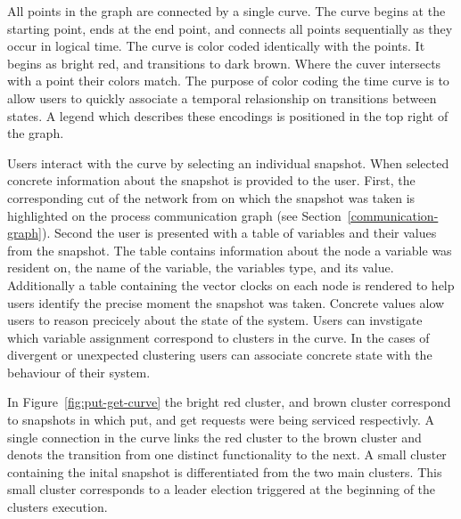         All points in the graph are connected by a single curve. The
        curve begins at the starting point, ends at the end point, and
        connects all points sequentially as they occur in logical
        time. The curve is color coded identically with the points. It
        begins as bright red, and transitions to dark brown. Where the
        cuver intersects with a point their colors match. The purpose
        of color coding the time curve is to allow users to quickly
        associate a temporal relasionship on transitions between
        states. A legend which describes these encodings is positioned
        in the top right of the graph.

        Users interact with the curve by selecting an individual
        snapshot. When selected concrete information about the
        snapshot is provided to the user. First, the corresponding cut
        of the network from on which the snapshot was taken is
        highlighted on the process communication graph (see
        Section~\ref{communication-graph}). Second the user is
        presented with a table of variables and their values from the
        snapshot. The table contains information about the node a
        variable was resident on, the name of the variable, the
        variables type, and its value. Additionally a table containing
        the vector clocks on each node is rendered to help users
        identify the precise moment the snapshot was taken. Concrete
        values alow users to reason precicely about the state of the
        system. Users can invstigate which variable assignment
        correspond to clusters in the curve. In the cases of divergent
        or unexpected clustering users can associate concrete state
        with the behaviour of their system.

        In Figure~\ref{fig:put-get-curve} the bright red cluster, and
        brown cluster correspond to snapshots in which put, and get
        requests were being serviced respectivly. A single connection
        in the curve links the red cluster to the brown cluster and
        denots the transition from one distinct functionality to the
        next. A small cluster containing the inital snapshot is
        differentiated from the two main clusters. This small cluster
        corresponds to a leader election triggered at the beginning of
        the clusters execution.

